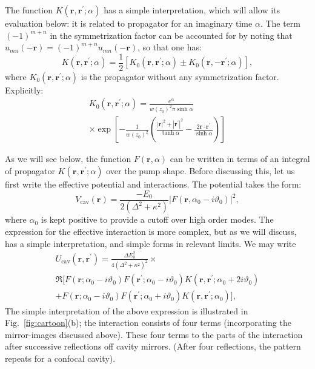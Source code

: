 \documentclass[pra,twocolumn,superscriptaddress]{revtex4-1}
\newcommand{\vect}[1]{\mathbf{#1}}
\begin{document}
The function $K(\vect r, \vect r^\prime; \alpha)$ has a simple
interpretation, which will allow its evaluation below: it is related
to propagator for an imaginary time $\alpha$.  The term $(-1)^{m+n}$
in the symmetrization factor can be accounted for by noting
that $u_{mn}(-\vect{r}) = (-1)^{m+n}u_{mn}(-\vect{r})$, so that one has:
\begin{displaymath}
  K(\vect r, \vect r^\prime; \alpha)
  =
  \frac{1}{2} \left[
    K_0(\vect r,  \vect r^\prime; \alpha)
    \pm
    K_0(\vect r, - \vect r^\prime; \alpha)
  \right],
\end{displaymath}
where $K_0(\vect r,  \vect r^\prime; \alpha)$ is the propagator without
any symmetrization factor.  Explicitly:
\begin{multline}
  \label{eq:14}
  K_0(\vect r,  \vect r^\prime; \alpha)
  =
  \frac{e^{\alpha}}{w(z_0)^2 \pi \sinh \alpha}
  \\\times
  \exp\left[
    - 
    \frac{1}{ w(z_0)^2}
    \left(
      \frac{|\vect{r}|^2 + |\vect{r}^{\prime}|^{2}}{ \tanh \alpha}
      -
       \frac{2 \vect{r} \cdot \vect{r}^\prime}{\sinh \alpha}
      \right)
  \right]
\end{multline}


As we will see below, the
function $F(\vect{r},\alpha)$ can be written in terms of an integral of
propagator $K(\vect r, \vect r^\prime;\alpha)$ over the pump
shape. Before discussing this, let us first write the effective
potential and interactions.  The potential takes the form:
\begin{equation}\label{eq:9}
  V_{\text{cav}}(\vect{r})   = \frac{-E_0}{2(\Delta^2+\kappa^2)}
  |F(\vect r, \alpha_0-i\vartheta_0)|^2,
\end{equation}
where $\alpha_0$ is kept positive to provide a cutoff over high order
modes.  The expression for the effective interaction is more complex,
but as we will discuss, has a simple interpretation, and simple
forms in relevant limits.  We may write
\begin{multline}\label{eq:10}
  U_{\text{cav}}(\vect r, \vect r^\prime) =
  \frac{ \Delta E_0^2}{4 (\Delta^2+\kappa^2)^2} 
  \times\\\Re\bigl[
  F(\vect r; \alpha_0-i\vartheta_0)
  F(\vect r^\prime; \alpha_0-i\vartheta_0)
  K(\vect r,\vect r^\prime; \alpha_0+2i\vartheta_0)
  \\+
  F(\vect r; \alpha_0-i\vartheta_0)
  F(\vect r^\prime; \alpha_0+i\vartheta_0)
  K(\vect r,\vect r^\prime; \alpha_0)
  \bigr],
\end{multline}
The simple interpretation of the above expression is illustrated in
Fig.~\ref{fig:cartoon}(b); the interaction consists of four terms
(incorporating the mirror-images discussed above). These four terms to
the parts of the interaction after successive reflections off cavity
mirrors.  (After four reflections, the pattern repeats for a confocal
cavity).
\end{document}
